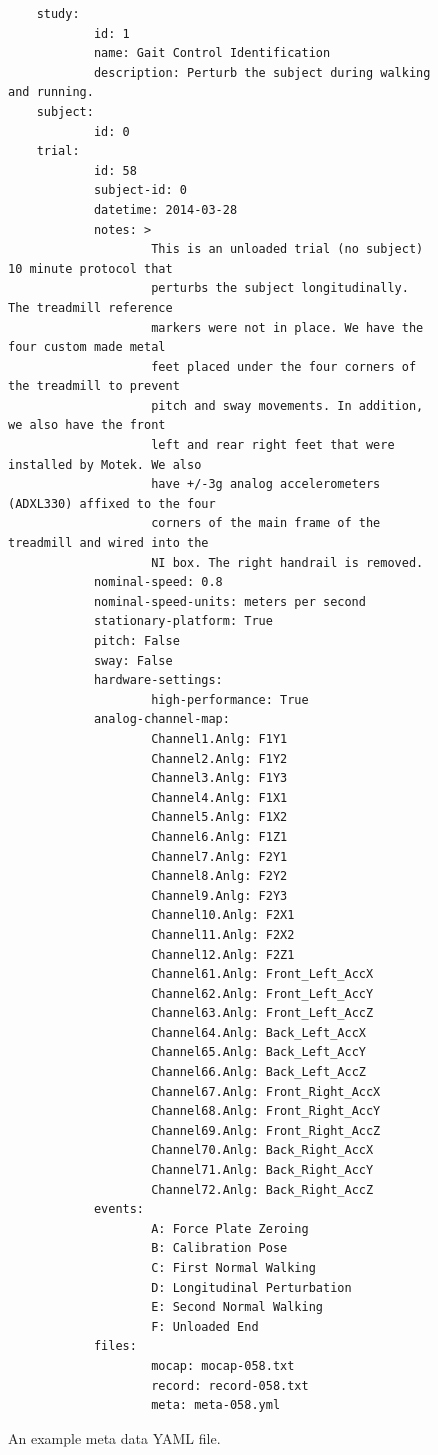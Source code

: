 \documentclass[10pt,a4paper,twocolumn]{article}
\begin{document}
\begin{figure}
  \small
  \begin{verbatim}
    study:
            id: 1
            name: Gait Control Identification
            description: Perturb the subject during walking and running.
    subject:
            id: 0
    trial:
            id: 58
            subject-id: 0
            datetime: 2014-03-28
            notes: >
                    This is an unloaded trial (no subject) 10 minute protocol that
                    perturbs the subject longitudinally. The treadmill reference
                    markers were not in place. We have the four custom made metal
                    feet placed under the four corners of the treadmill to prevent
                    pitch and sway movements. In addition, we also have the front
                    left and rear right feet that were installed by Motek. We also
                    have +/-3g analog accelerometers (ADXL330) affixed to the four
                    corners of the main frame of the treadmill and wired into the
                    NI box. The right handrail is removed.
            nominal-speed: 0.8
            nominal-speed-units: meters per second
            stationary-platform: True
            pitch: False
            sway: False
            hardware-settings:
                    high-performance: True
            analog-channel-map:
                    Channel1.Anlg: F1Y1
                    Channel2.Anlg: F1Y2
                    Channel3.Anlg: F1Y3
                    Channel4.Anlg: F1X1
                    Channel5.Anlg: F1X2
                    Channel6.Anlg: F1Z1
                    Channel7.Anlg: F2Y1
                    Channel8.Anlg: F2Y2
                    Channel9.Anlg: F2Y3
                    Channel10.Anlg: F2X1
                    Channel11.Anlg: F2X2
                    Channel12.Anlg: F2Z1
                    Channel61.Anlg: Front_Left_AccX
                    Channel62.Anlg: Front_Left_AccY
                    Channel63.Anlg: Front_Left_AccZ
                    Channel64.Anlg: Back_Left_AccX
                    Channel65.Anlg: Back_Left_AccY
                    Channel66.Anlg: Back_Left_AccZ
                    Channel67.Anlg: Front_Right_AccX
                    Channel68.Anlg: Front_Right_AccY
                    Channel69.Anlg: Front_Right_AccZ
                    Channel70.Anlg: Back_Right_AccX
                    Channel71.Anlg: Back_Right_AccY
                    Channel72.Anlg: Back_Right_AccZ
            events:
                    A: Force Plate Zeroing
                    B: Calibration Pose
                    C: First Normal Walking
                    D: Longitudinal Perturbation
                    E: Second Normal Walking
                    F: Unloaded End
            files:
                    mocap: mocap-058.txt
                    record: record-058.txt
                    meta: meta-058.yml
  \end{verbatim}
  \caption{An example meta data YAML file.}
  \label{fig:example-meta-data}
\end{figure}
\end{document}
